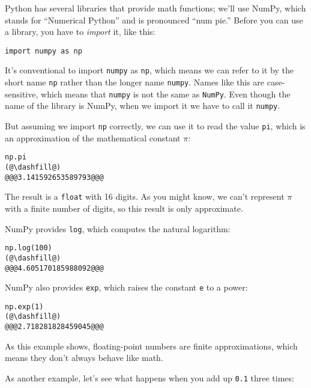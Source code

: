 Python has several libraries that provide math functions; we'll use NumPy, which stands for ``Numerical Python''
and is pronounced ``num pie.'' Before you can use a library, you have to
\emph{import} it, like this:

\begin{lstlisting}[]
import numpy as np
\end{lstlisting}

It's conventional to import \passthrough{\lstinline!numpy!} as
\passthrough{\lstinline!np!}, which means we can refer to it by the
short name \passthrough{\lstinline!np!} rather than the longer name
\passthrough{\lstinline!numpy!}. Names like this are case-sensitive,
which means that \passthrough{\lstinline!numpy!} is not the same as
\passthrough{\lstinline!NumPy!}. Even though the name of the library
is NumPy, when we import it we have to call it
\passthrough{\lstinline!numpy!}.

But assuming we import \passthrough{\lstinline!np!} correctly, we can
use it to read the value \passthrough{\lstinline!pi!}, which is an
approximation of the mathematical constant \(\pi\):

\begin{lstlisting}[]
np.pi
(@\dashfill@)
@@@3.141592653589793@@@
\end{lstlisting}

The result is a \passthrough{\lstinline!float!} with 16 digits. As you
might know, we can't represent \(\pi\) with a finite number of digits,
so this result is only approximate.

NumPy provides \passthrough{\lstinline!log!}, which computes the natural
logarithm:

\begin{lstlisting}[]
np.log(100)
(@\dashfill@)
@@@4.605170185988092@@@
\end{lstlisting}

NumPy also provides \passthrough{\lstinline!exp!}, which raises the
constant \passthrough{\lstinline!e!} to a power:

\begin{lstlisting}[]
np.exp(1)
(@\dashfill@)
@@@2.718281828459045@@@
\end{lstlisting}


As this example shows, floating-point numbers are finite approximations,
which means they don't always behave like math.

As another example, let's see what happens when you add up
\passthrough{\lstinline!0.1!} three times:

